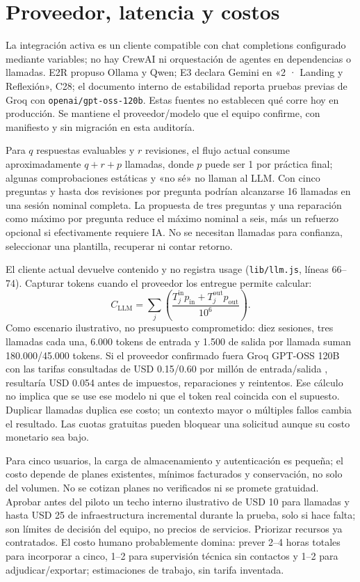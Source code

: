 \documentclass[11pt,a4paper]{report}
\newcommand{\src}[2]{\nolinkurl{#1}, líneas #2}
\begin{document}
\section{Proveedor, latencia y costos}
La integración activa es un cliente compatible con chat completions configurado mediante variables; no hay CrewAI ni orquestación de agentes en dependencias o llamadas. E2R propuso Ollama y Qwen; E3 declara Gemini en «2 · Landing y Reflexión», C28; el documento interno de estabilidad reporta pruebas previas de Groq con \texttt{openai/gpt-oss-120b}. Estas fuentes no establecen qué corre hoy en producción. Se mantiene el proveedor/modelo que el equipo confirme, con manifiesto y sin migración en esta auditoría.

Para \(q\) respuestas evaluables y \(r\) revisiones, el flujo actual consume aproximadamente \(q+r+p\) llamadas, donde \(p\) puede ser 1 por práctica final; algunas comprobaciones estáticas y «no sé» no llaman al LLM. Con cinco preguntas y hasta dos revisiones por pregunta podrían alcanzarse 16 llamadas en una sesión nominal completa. La propuesta de tres preguntas y una reparación como máximo por pregunta reduce el máximo nominal a seis, más un refuerzo opcional si efectivamente requiere IA. No se necesitan llamadas para confianza, seleccionar una plantilla, recuperar ni contar retorno.

El cliente actual devuelve contenido y no registra usage (\src{lib/llm.js}{66--74}). Capturar tokens cuando el proveedor los entregue permite calcular:
\[
C_{\mathrm{LLM}}=\sum_j\left(\frac{T^{\mathrm{in}}_j p_{\mathrm{in}}+T^{\mathrm{out}}_j p_{\mathrm{out}}}{10^6}\right).
\]
Como escenario ilustrativo, no presupuesto comprometido: diez sesiones, tres llamadas cada una, 6.000 tokens de entrada y 1.500 de salida por llamada suman 180.000/45.000 tokens. Si el proveedor confirmado fuera Groq GPT-OSS 120B con las tarifas consultadas de USD 0.15/0.60 por millón de entrada/salida \cite{groq}, resultaría USD 0.054 antes de impuestos, reparaciones y reintentos. Ese cálculo no implica que se use ese modelo ni que el token real coincida con el supuesto. Duplicar llamadas duplica ese costo; un contexto mayor o múltiples fallos cambia el resultado. Las cuotas gratuitas pueden bloquear una solicitud aunque su costo monetario sea bajo.

Para cinco usuarios, la carga de almacenamiento y autenticación es pequeña; el costo depende de planes existentes, mínimos facturados y conservación, no solo del volumen. No se cotizan planes no verificados ni se promete gratuidad. Aprobar antes del piloto un techo interno ilustrativo de USD 10 para llamadas y hasta USD 25 de infraestructura incremental durante la prueba, solo si hace falta; son límites de decisión del equipo, no precios de servicios. Priorizar recursos ya contratados. El costo humano probablemente domina: prever 2--4 horas totales para incorporar a cinco, 1--2 para supervisión técnica sin contactos y 1--2 para adjudicar/exportar; estimaciones de trabajo, sin tarifa inventada.
\end{document}
